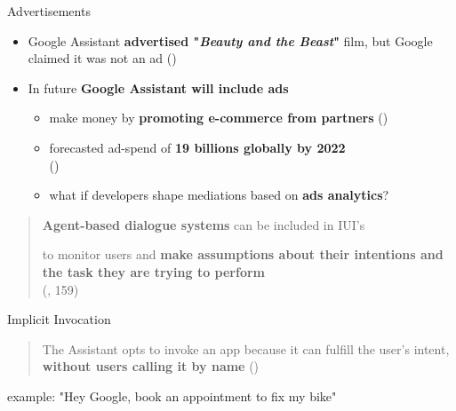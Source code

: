 \documentclass{beamer}
\begin{document}
\begin{frame}[allowframebreaks]
\begin{block}{Advertisements}
	\begin{itemize}
		\item Google Assistant \textbf{advertised "\emph{Beauty and the Beast}"} film, but Google claimed it was not an ad (\cite{androidPolice})
		\medskip
		\item In future \textbf{Google Assistant will include ads}
			\begin{itemize}
				\item make money by \textbf{promoting e-commerce from partners} (\cite{recode})
				\smallskip
				\item forecasted ad-spend of \textbf{19 billions globally by 2022}
				\\(\cite{juniper})
				\smallskip
				\item what if developers shape mediations based on \textbf{ads analytics}?
			\end{itemize}
	\end{itemize}
\end{block}

\framebreak

\begin{quote}
	\textbf{Agent-based dialogue systems} can be included in IUI’s

	to monitor users and \textbf{make assumptions about their intentions and the task they are trying to perform} \\(\cite{brey2005freedom}, 159)
\end{quote}
\medskip

\begin{block}{Implicit Invocation}
\begin{quote}
The Assistant opts to invoke an app because it can fulfill the user's intent, \textbf{without users calling it by name} (\cite{googleactions})
\end{quote}

\bigskip
example: "Hey Google, book an appointment to fix my bike"
\end{block}
\end{frame}
\end{document}
